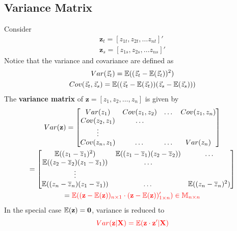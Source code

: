 \documentclass[]{article}
\begin{document}
    		\subsection{Variance Matrix}
    			\par Consider 
    			\begin{gather*}
    				\textbf{z}_t = [z_{1t}, z_{2t}, \dots z_{nt}]' \\
    				\textbf{z}_s = [z_{1s}, z_{2s}, \dots z_{ns}]'
    			\end{gather*}
    			Notice that the variance and covariance are defined as
    			\begin{gather*}
    				Var(\vec{z}_t) = \mathbb{E}({(\vec{z}_t - \mathbb{E}({\vec{z}_t}))^2}) \\
    				Cov(\vec{z}_t, \vec{z}_s) = \mathbb{E}({(\vec{z}_t - \mathbb{E}({\vec{z}_t}))(\vec{z}_s - \mathbb{E}({\vec{z}_s}))})
    			\end{gather*}
    			The \textbf{variance matrix} of $\textbf{z} = [z_1, z_2, \dots, z_n]$ is given by
    			\begin{gather*}
    				Var(\textbf{z}) = \begin{bmatrix}
    					Var(z_1) & Cov(z_1, z_2) & \dots & Cov(z_1, z_n) \\
    					Cov(z_2, z_1) & \dots \\
    					\vdots \\
    					Cov(z_n, z_1) & \dots & \dots & Var(z_n) \\
    				\end{bmatrix} \\
    				= 
    				\begin{bmatrix}
    					\mathbb{E}({(z_1 - \overline{z}_1)^2}) & \mathbb{E}({(z_1 - \overline{z}_1)(z_2 - \overline{z}_2)}) & \dots \\
    					\mathbb{E}({(z_2 - \overline{z}_2)(z_1 - \overline{z}_1)}) & \dots \\
    					\vdots \\
    					\mathbb{E}({(z_n - \overline{z}_n)(z_1 - \overline{z}_1)}) & \dots & \mathbb{E}({(z_n - \overline{z}_n)^2}) \\
    				\end{bmatrix} \\
    				= \textcolor{red}{
    				\mathbb{E}({(\textbf{z} - \mathbb{E}({\textbf{z}}))_{n \times 1} \cdot (\textbf{z} - \mathbb{E}({\textbf{z}}))'_{1 \times n}}) \in \mathbb{M}_{n \times n}
    				}
    			\end{gather*}
    			In the special case $\mathbb{E}({\textbf{z}}) = \textbf{0}$, variance is reduced to
    			\[
    				\textcolor{red}{
    					Var(\textbf{z}|\textbf{X}) = \mathbb{E}({\textbf{z} \cdot \textbf{z}'|\textbf{X}})
    				}
    			\]
\end{document}
